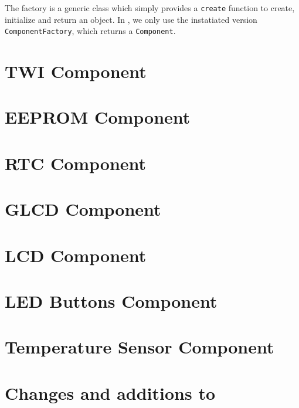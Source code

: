 The factory is a generic class which simply provides a \lstinline|create| function
to create, initialize and return an object. In \qsimavr, we only use the instatiated
version \lstinline|ComponentFactory|, which returns a \lstinline|Component|.

\section{\acf{TWI} Component}

\section{\acf{EEPROM} Component}

\cite{microchip01}

\section{\acf{RTC} Component}

\cite{maxim01}

\section{\acf{GLCD} Component}

\cite{winstar01, samsung01, neotec01}

\section{\acf{LCD} Component}

\cite{hitachi01, samsung02, winstar02}

\section{\acf{LED} Buttons Component}

\section{Temperature Sensor Component}

\cite{maxim02}

\section{Changes and additions to \simavr}
